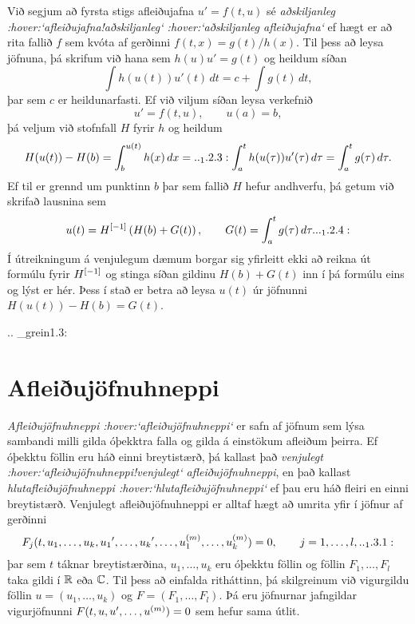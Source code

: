 Við segjum að fyrsta stigs afleiðujafna $u'=f(t,u)$ sé
{\it aðskiljanleg :hover:`afleiðujafna!aðskiljanleg` :hover:`aðskiljanleg
afleiðujafna`} ef hægt er að
rita fallið $f$ sem kvóta af gerðinni $f(t,x)=g(t)/h(x)$.
Til þess að leysa jöfnuna, þá skrifum við hana
sem  $h(u)u'=g(t)$ og heildum síðan
$$ \int h(u(t))u'(t) \, dt = c+\int g(t)\, dt, $$
þar sem $c$ er heildunarfasti.  Ef við viljum síðan leysa verkefnið
$$ u'=f(t,u), \qquad u(a)=b, $$
þá  veljum við stofnfall $H$ fyrir
$h$ og heildum
 \begin{equation*}H(u(t))-H(b)= \int_b\sp{u(t)} h(x) \, dx =

.. _1.2.3:

\int_a\sp t h(u({\tau}))u'({\tau}) \, d{\tau} = 
\int_a\sp t g(\tau) \, d\tau.
 \end{equation*}
Ef til er grennd um punktinn $b$ þar sem fallið $H$ hefur andhverfu,
þá getum við skrifað lausnina sem
 \begin{equation*}u(t) = H\sp{[-1]}\left( H(b)+G(t)\right), \qquad G(t)=\int_a\sp t
g(\tau)\, d\tau. 

.. _1.2.4:

 \end{equation*}
Í útreikningum á venjulegum dæmum borgar sig yfirleitt ekki að reikna
út formúlu fyrir $H\sp {[-1]}$ og stinga síðan gildinu $H(b)+G(t)$
inn í þá formúlu eins og lýst er hér.  Þess í stað er betra að
leysa $u(t)$ úr jöfnunni $H(u(t))-H(b)=G(t)$.


.. _grein1.3:

\section{Afleiðujöfnuhneppi}

\noindent
{\it Afleiðujöfnuhneppi :hover:`afleiðujöfnuhneppi`} er safn af jöfnum sem
lýsa sambandi milli gilda
óþekktra falla og gilda á einstökum afleiðum þeirra.  Ef óþekktu föllin eru
háð einni breytistærð, þá kallast það {\it
venjulegt :hover:`afleiðujöfnuhneppi!venjulegt` afleiðujöfnuhneppi},
en það kallast {\it
hlutafleiðujöfnuhneppi :hover:`hlutafleiðujöfnuhneppi`} ef þau eru háð fleiri en
einni breytistærð.  Venjulegt afleiðujöfnuhneppi er alltaf hægt að
umrita yfir í jöfnur af gerðinni
\begin{equation*}
F_j(t,u_1,\dots,u_k,u_1\dash,\dots,u_k\dash,\dots,
u_1^{(m)},\dots,u_k^{(m)})=0, \qquad j=1,\dots,l,


.. _1.3.1:

\end{equation*}
þar sem $t$ táknar breytistærðina, $u_1,\dots,u_k$ eru óþekktu föllin og
föllin $F_1,\dots,F_l$  taka gildi í ${\mathbb R}$ eða ${\mathbb C}$.  Til þess að einfalda
ritháttinn, þá skilgreinum við vigurgildu föllin $u=(u_1,\dots,u_k)$ og
$F=(F_1,\dots,F_l)$. Þá eru jöfnurnar jafngildar vigurjöfnunni
$F(t,u,u{\sp{\prime}},\dots,u^{(m)})=0$
sem hefur sama útlit.


